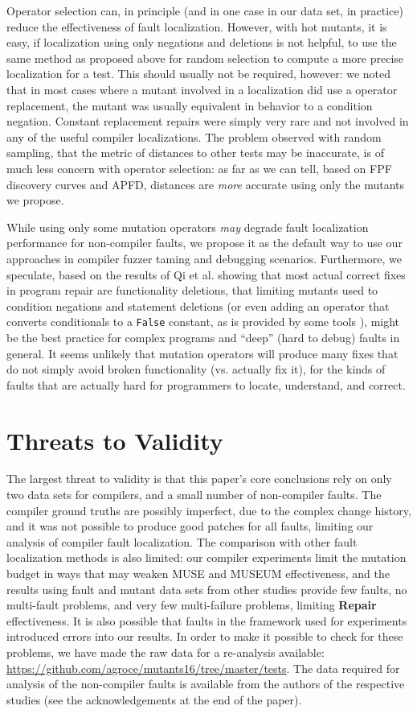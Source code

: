 Operator selection can, in principle (and in one case in our data set, in practice) reduce the effectiveness of fault localization.  However, with hot mutants, it is easy, if localization using only negations and deletions is not helpful, to use the same method as proposed above for random selection to compute a more precise localization for a test.  This should usually not be required, however:  we noted that in most cases where a mutant involved in a localization did use a operator replacement, the mutant was usually equivalent in behavior to a condition negation.  Constant replacement repairs were simply very rare and not involved in any of the useful compiler localizations.  The problem observed with random sampling, that the metric of distances to other tests may be inaccurate, is of much less concern with operator selection:  as far as we can tell, based on FPF discovery curves and APFD, distances are \emph{more} accurate using only the mutants we propose.

While using only some mutation operators \emph{may} degrade fault localization performance for non-compiler faults, we propose it as the default way to use our approaches in compiler fuzzer taming  and debugging scenarios.  Furthermore, we speculate, based on the results of Qi et al. \cite{achour} showing that most actual correct fixes in program repair are functionality deletions, that limiting mutants used to condition negations and statement deletions (or even adding an operator that converts conditionals to a {\tt False} constant, as is provided by some tools \cite{RegExpMut}), might be the best practice for complex programs and ``deep'' (hard to debug) faults in general.  It seems unlikely that mutation operators will produce many fixes that do not simply avoid broken functionality (vs. actually fix it), for the kinds of faults that are actually hard for programmers to locate, understand, and correct.

\section{Threats to Validity}

The largest threat to validity is that this paper's core conclusions rely on only two data sets for compilers, and a small number of non-compiler faults.  The compiler ground truths are possibly imperfect, due to the complex change history, and it was not possible to produce good patches for all faults, limiting our analysis of compiler fault localization.    The comparison with other fault localization methods is also limited:  our compiler experiments limit the mutation budget in ways that may weaken MUSE and MUSEUM effectiveness, and the results using fault and mutant data sets from other studies provide few faults, no multi-fault problems, and very few multi-failure problems, limiting {\bf Repair} effectiveness.   It is also possible that faults in the framework used for experiments introduced errors into our results.  In order to make it possible to check for these problems, we have made the raw data for a re-analysis available: \url{https://github.com/agroce/mutants16/tree/master/tests}.  The data required for analysis of the non-compiler faults is available from the authors of the respective studies (see the acknowledgements at the end of the paper).
